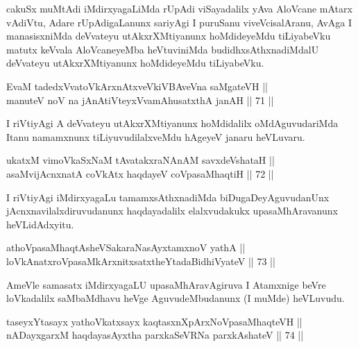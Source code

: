 \begin{artha}
cakuSx muMtAdi iMdirxyagaLiMda rUpAdi viSayadalilx yAva AloVcane
mAtarx vAdiVtu, Adare rUpAdigaLanunx sariyAgi I puruSanu
viveVcisalAranu, AvAga I manasisxniMda deVvateyu utAkxrXMtiyanunx
hoMdideyeMdu tiLiyabeVku matutx keVvala AloVcaneyeMba heVtuviniMda
budidhxsAthxnadiMdalU deVvateyu utAkxrXMtiyanunx hoMdideyeMdu
tiLiyabeVku.
\end{artha}

\begin{shl}
EvaM tadedxVvatoVkArxnAtxveVkiVBAveVna saMgateVH || \\
manuteV noV na jAnAtiVteyxVvamAhusatxthA janAH \hfill || 71 ||  
\end{shl}

\begin{artha}
I riVtiyAgi A deVvateyu utAkxrXMtiyanunx hoMdidalilx oMdAguvudariMda
Itanu namamxnunx tiLiyuvudilalxveMdu hAgeyeV janaru heVLuvaru.
\end{artha}

\begin{shl}
ukatxM vimoVkaSxNaM tAvatakxraNAnAM savxdeVshataH || \\
asaMvijAcnxnatA coVkAtx haqdayeV coVpasaMhaqtiH \hfill || 72 ||  
\end{shl}

\begin{artha}
I riVtiyAgi iMdirxyagaLu tamamxsAthxnadiMda biDugaDeyAguvudanUnx
jAcnxnavilalxdiruvudanunx haqdayadalilx elalxvudakukx upasaMhAravanunx
heVLidAdxyitu.
\end{artha}

\begin{shl}
athoVpasaMhaqtAsheVSakaraNasAyx\s \s tamxnoV yathA || \\
loVkAnatxroVpasaMkArxnitxsatxtheYtadaBidhiVyateV \hfill || 73 ||  
\end{shl}

\begin{artha}
AmeVle samasatx iMdirxyagaLU upasaMhAravAgiruva I Atamxnige beVre
loVkadalilx saMbaMdhavu heVge AguvudeMbudanunx (I muMde) heVLuvudu.
\end{artha}


\begin{shl}
taseyxYtasayx yathoVkatxsayx kaqtasxnXpArxNoVpasaMhaqteVH || \\
nADayxgarxM haqdayasAyxtha parxkaSeVRNa parxkAshateV \hfill || 74 ||  
\end{shl}

